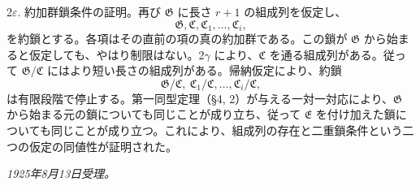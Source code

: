 \documentclass[11pt]{article}
\providecommand{\mC}{\mathfrak{C}}
\providecommand{\mE}{\mathfrak{E}}
\providecommand{\mG}{\mathfrak{G}}
\begin{document}
2$\varepsilon$. 約加群鎖条件の証明。再び $\mG$ に長さ $r+1$ の組成列を仮定し、
\[
        \mG,\mC,\mC_1,\ldots,\mC_i,
\]
を約鎖とする。各項はその直前の項の真の約加群である。この鎖が $\mG$ から始まると仮定しても、やはり制限はない。2$\gamma$ により、$\mC$ を通る組成列がある。従って $\mG/\mC$ にはより短い長さの組成列がある。帰納仮定により、約鎖
\[
        \mG/\mC,\ \mC_1/\mC,\ldots,\mC_i/\mC,
\]
は有限段階で停止する。第一同型定理（§4, 2）が与える一対一対応により、$\mG$ から始まる元の鎖についても同じことが成り立ち、従って $\mE$ を付け加えた鎖についても同じことが成り立つ。これにより、組成列の存在と二重鎖条件という二つの仮定の同値性が証明された。

\emph{1925年8月13日受理。}
\end{document}
